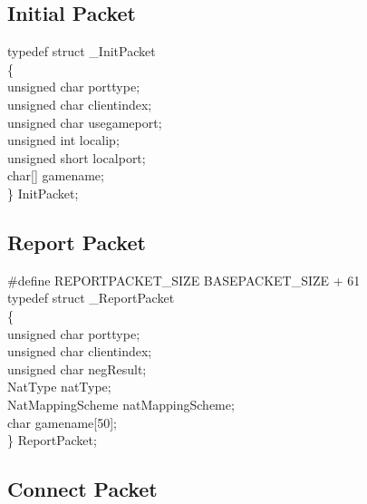 \documentclass[oneside,titlepage,a4paper]{Definition/retrospy} %
\begin{document}
%
%
%
%


\subsection{Initial Packet}
\begin{mybox}
	typedef struct \_InitPacket\\
	\{\\
	unsigned char porttype;\\
	unsigned char clientindex;\\
	unsigned char usegameport;\\
	unsigned int localip;\\
	unsigned short localport;\\
		char[] gamename;\\
	\} InitPacket;\\

\end{mybox}

\subsection{Report Packet}

\begin{mybox}
	\#define REPORTPACKET\_SIZE BASEPACKET\_SIZE + 61\\
	typedef struct \_ReportPacket\\
	\{\\
	unsigned char porttype;\\
	unsigned char clientindex;\\
	unsigned char negResult;\\
	NatType natType;\\
	NatMappingScheme natMappingScheme;\\
	char gamename[50];\\
	\} ReportPacket;\\
\end{mybox}



\subsection{Connect Packet}
\end{document}
